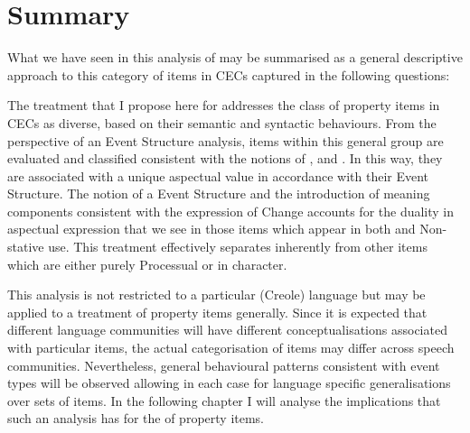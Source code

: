 \section{Summary}\label{sec:5.4}

What we have seen in this analysis of  may be summarised as a general descriptive approach to this category of items in CECs captured in the following questions:

\ea%
\label{ex:5:29}
 \z
\z 

The treatment that I propose here for  addresses the class of property items in CECs as diverse, based on their semantic and syntactic behaviours. From the perspective of an Event Structure analysis, items within this general group are evaluated and classified consistent with the notions of ,  and . In this way, they are associated with a unique aspectual value in accordance with their Event Structure. The notion of a  Event Structure and the introduction of meaning components consistent with the expression of Change accounts for the duality in aspectual expression that we see in those items which appear in both  and Non-stative use. This treatment effectively separates inherently  from other items which are either purely Processual or  in character. 

This analysis is not restricted to a particular (Creole) language but may be applied to a treatment of property items generally. Since it is expected that different language communities will have different conceptualisations associated with particular items, the actual categorisation of items may differ across speech communities. Nevertheless, general behavioural patterns consistent with event types will be observed allowing in each case for language specific generalisations over sets of items. In the following chapter I will analyse the implications that such an analysis has for the  of property items.
